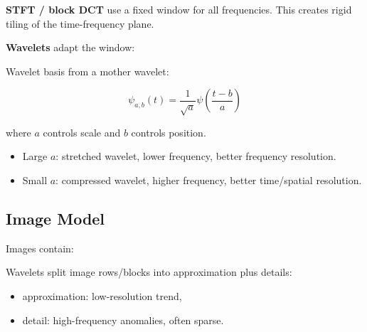 \textbf{STFT / block DCT} use a fixed window for all frequencies. This creates rigid tiling of the time-frequency plane.

\textbf{Wavelets} adapt the window:

\begin{center}
\end{center}

Wavelet basis from a mother wavelet:

\[
\psi_{a,b}(t)
=
\frac{1}{\sqrt{a}}\psi\left(\frac{t-b}{a}\right)
\]

where $a$ controls scale and $b$ controls position.

\begin{itemize}
  \item Large $a$: stretched wavelet, lower frequency, better frequency resolution.
  \item Small $a$: compressed wavelet, higher frequency, better time/spatial resolution.
\end{itemize}

\subsection{Image Model}

Images contain:

\begin{center}
\end{center}

Wavelets split image rows/blocks into approximation plus details:

\begin{itemize}
  \item approximation: low-resolution trend,
  \item detail: high-frequency anomalies, often sparse.
\end{itemize}

